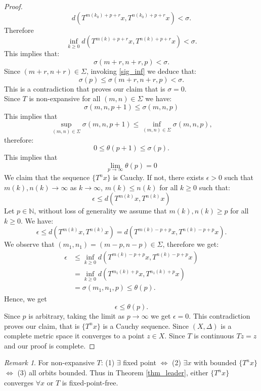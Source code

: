 \documentclass{birkjour}
\theoremstyle{definition}
\theoremstyle{remark}
\newtheorem{rem}[thm]{Remark}
\numberwithin{equation}{section}
\begin{document}
\begin{proof}
\begin{equation}
d(T^{m(k_0)+p+r}x,T^{n(k_0)+p+r}x) < \sigma.
\end{equation}
Therefore
\[
\inf_{k\geq 0} d(T^{m(k)+p+r}x,T^{n(k)+p+r}x)< \sigma.
\]
This implies that:
\begin{equation}\label{lead_3}
\sigma(m+r,n+r,p) < \sigma.
\end{equation}
Since $(m+r,n+r)\in \Sigma$,  invoking \eqref{sig_inf} we deduce that:
\begin{equation}
\sigma(p)\leq \sigma(m+r,n+r,p) < \sigma.
\end{equation}
This is a contradiction that  proves our claim that is $\sigma = 0$.\\
Since $T$ is non-expansive for all $(m,n)\in \Sigma$ we have:
\[
\sigma(m,n,p+1)\leq \sigma(m,n,p)
\]
This implies that 
\[
\sup_{(m,n)\in\Sigma}\sigma(m,n,p+1)\leq  \inf_{(m,n)\in\Sigma} \sigma(m,n,p),
\]
therefore:
\[
0\leq \theta(p+1) \leq \sigma(p).
\]
This implies that 
\begin{equation}
\lim_{p\to\infty}\theta(p) = 0
\end{equation}
We claim that the sequence $\{T^{n}x\}$ is Cauchy. If not, there exists $\epsilon>0$ such that $m(k),n(k)\to \infty$ as $k\to\infty$, $m(k)\leq n(k)$ for all $k\geq 0$ such that:
\[
\epsilon\leq d(T^{m(k)}x,T^{n(k)}x)
\]
Let $p\in \mathbb{N}$, without loss of generality we assume that $m(k),n(k)\geq p$ for all $k\geq 0$. We have:
\begin{equation}
\epsilon\leq d(T^{m(k)}x,T^{n(k)}x) =  d(T^{m(k)-p+p}x,T^{n(k)-p+p}x).
\end{equation}
We observe that $(m_1,n_1) = (m-p, n-p)\in \Sigma$, therefore we get:
\begin{align}
\epsilon&\leq \inf_{k\geq 0}d(T^{m(k)-p+p}x,T^{n(k)-p+p}x)\nonumber\\
& = \inf_{k\geq 0}d(T^{m_1(k)+p}x,T^{n_1(k)+p}x)\nonumber\\
&= \sigma(m_1,n_1,p)\leq \theta(p)\nonumber.
\end{align}
Hence, we get
\[
\epsilon\leq \theta(p).
\]
Since $p$ is arbitrary, taking the limit as $p\to \infty$ we get $\epsilon = 0$. This contradiction proves our claim, that is $\{T^{n}x\}$ is a Cauchy sequence. Since $(X,\Delta)$ is a complete metric space it converges to a point $z\in X$. Since $T$ is continuous $Tz=z$ and our proof is complete.
\end{proof}
\begin{rem}
For non-expansive $T$: (1) $\exists$ fixed point $\iff$ (2) $\exists x$ with bounded $\{T^nx\}$ $\iff$ (3) all orbits bounded. Thus in Theorem \ref{thm_leader}, either $\{T^nx\}$ converges $\forall x$ or $T$ is fixed-point-free.
\end{rem}
\end{document}

